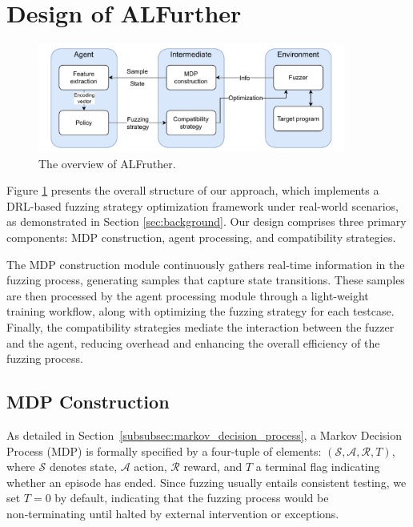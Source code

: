 \documentclass[lettersize,journal]{IEEEtran}
\begin{document}
\section{Design of ALFurther}\label{sec:method}
\begin{figure}[t!]
	\centerline{\includegraphics[width=0.9\textwidth]{fig/simplified_overview.pdf}}
	\caption{The overview of ALFruther.}
	\label{fig:overview}
\end{figure}

Figure \ref{fig:overview} presents the overall structure of our approach, which implements a DRL-based fuzzing strategy optimization framework under real-world scenarios, as demonstrated in Section \ref{sec:background}. Our design comprises three primary components: MDP construction, agent processing, and compatibility strategies.

The MDP construction module continuously gathers real-time information in the fuzzing process, generating samples that capture state transitions. These samples are then processed by the agent processing module through a light-weight training workflow, along with optimizing the fuzzing strategy for each testcase. Finally, the compatibility strategies mediate the interaction between the fuzzer and the agent, reducing overhead and enhancing the overall efficiency of the fuzzing process.


\subsection{MDP Construction}\label{subsec:mdp_construction}

As detailed in Section \ref{subsubsec:markov_decision_process}, a Markov Decision Process (MDP) is formally specified by a four-tuple of elements: $(\mathcal{S}, \mathcal{A}, \mathcal{R}, T)$, where $\mathcal{S}$ denotes state, $\mathcal{A}$ action, $\mathcal{R}$ reward, and $T$ a terminal flag indicating whether an episode has ended. Since fuzzing usually entails consistent testing, we set $T=0$ by default, indicating that the fuzzing process would be non‑terminating until halted by external intervention or exceptions.
\end{document}
